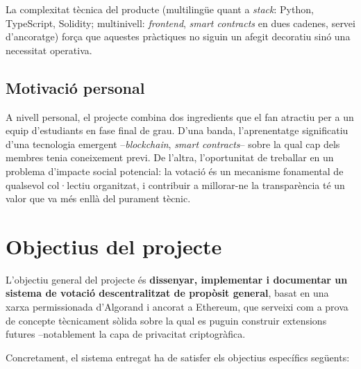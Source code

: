 La complexitat tècnica del producte (multilingüe quant a
\emph{stack}: Python, TypeScript, Solidity; multinivell: \emph{frontend},
\emph{smart contracts} en dues cadenes, servei d'ancoratge) força que
aquestes pràctiques no siguin un afegit decoratiu sinó una necessitat
operativa.

\subsection{Motivació personal}

A nivell personal, el projecte combina dos ingredients que el fan
atractiu per a un equip d'estudiants en fase final de grau. D'una
banda, l'aprenentatge significatiu d'una tecnologia emergent
--\emph{blockchain}, \emph{smart contracts}-- sobre la qual cap dels
membres tenia coneixement previ. De l'altra, l'oportunitat de treballar
en un problema d'impacte social potencial: la votació és un mecanisme
fonamental de qualsevol col·lectiu organitzat, i contribuir a millorar-ne
la transparència té un valor que va més enllà del purament tècnic.

\section{Objectius del projecte}
\label{sec:objectiu}

L'objectiu general del projecte és \textbf{dissenyar, implementar i
documentar un sistema de votació descentralitzat de propòsit general},
basat en una xarxa permissionada d'Algorand i ancorat a Ethereum, que
serveixi com a prova de concepte tècnicament sòlida sobre la qual es
puguin construir extensions futures --notablement la capa de privacitat
criptogràfica.

Concretament, el sistema entregat ha de satisfer els objectius
específics següents:

